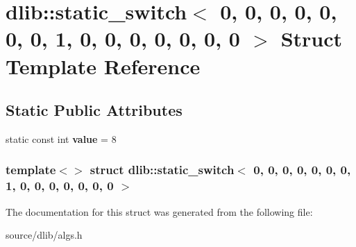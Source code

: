 \hypertarget{structdlib_1_1static__switch_3_010_00_010_00_010_00_010_00_010_00_010_00_010_00_011_00_010_00_0105236f4c56e9666de491dbb566b29360}{
\section{dlib::static\_\-switch$<$ 0, 0, 0, 0, 0, 0, 0, 1, 0, 0, 0, 0, 0, 0, 0 $>$ Struct Template Reference}
\label{structdlib_1_1static__switch_3_010_00_010_00_010_00_010_00_010_00_010_00_010_00_011_00_010_00_0105236f4c56e9666de491dbb566b29360}
}
\subsection*{Static Public Attributes}
\begin{DoxyCompactItemize}
\item 
\hypertarget{structdlib_1_1static__switch_3_010_00_010_00_010_00_010_00_010_00_010_00_010_00_011_00_010_00_0105236f4c56e9666de491dbb566b29360_a8571742226340f5a4be6eca0bf104f94}{
static const int {\bfseries value} = 8}
\label{structdlib_1_1static__switch_3_010_00_010_00_010_00_010_00_010_00_010_00_010_00_011_00_010_00_0105236f4c56e9666de491dbb566b29360_a8571742226340f5a4be6eca0bf104f94}

\end{DoxyCompactItemize}
\subsubsection*{template$<$$>$ struct dlib::static\_\-switch$<$ 0, 0, 0, 0, 0, 0, 0, 1, 0, 0, 0, 0, 0, 0, 0 $>$}



The documentation for this struct was generated from the following file:\begin{DoxyCompactItemize}
\item 
source/dlib/algs.h\end{DoxyCompactItemize}

